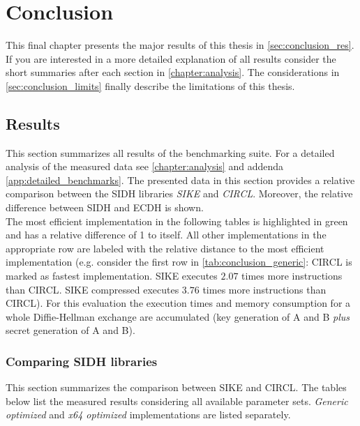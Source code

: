 \chapter{Conclusion}\label{chapter:conclusion}

This final chapter presents the major results of this thesis in \autoref{sec:conclusion_res}. If you are interested in a more detailed explanation of all results consider the short summaries after each section in \autoref{chapter:analysis}.  The considerations in \autoref{sec:conclusion_limits} finally describe the limitations of this thesis.

\section{Results}\label{sec:conclusion_res}

This section summarizes all results of the benchmarking suite. For a detailed analysis of the measured data see \autoref{chapter:analysis} and addenda \ref{app:detailed_benchmarks}. The presented data in this section provides a relative comparison between the \gls{SIDH} libraries \textit{\gls{SIKE}} and \textit{\gls{CIRCL}}. Moreover, the relative difference between \gls{SIDH} and \gls{ECDH} is shown.\\
The most efficient implementation in the following tables is highlighted in green and has a relative difference of 1 to itself. All other implementations in the appropriate row are labeled with the relative distance to the most efficient implementation (e.g. consider the first row in \autoref{tab:conclusion_generic}: \gls{CIRCL} is marked as fastest implementation. \gls{SIKE} executes $2.07$ times more instructions than \gls{CIRCL}. \gls{SIKE} compressed executes $3.76$ times more instructions than \gls{CIRCL}). For this evaluation the execution times and memory consumption for a whole Diffie-Hellman exchange are accumulated (key generation of A and B \textit{plus} secret generation of A and B).

\subsection{Comparing \gls{SIDH} libraries}
This section summarizes the comparison between \gls{SIKE} and \gls{CIRCL}. The tables below list the measured results considering all available parameter sets. \textit{Generic optimized} and \textit{x64 optimized} implementations are listed separately.

